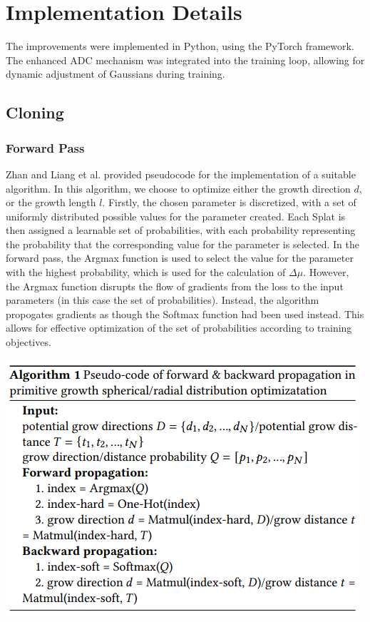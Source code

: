 \documentclass[11pt]{report}
\begin{document}
\section{Implementation Details}
The improvements were implemented in Python, using the PyTorch framework. The enhanced ADC mechanism was integrated into the training loop, allowing for dynamic adjustment of Gaussians during training.

\subsection{Cloning}
\subsubsection{Forward Pass}
Zhan and Liang et al. provided pseudocode for the implementation of a suitable algorithm. In this algorithm, we choose to optimize either the growth direction $d$, or the growth length $l$. Firstly, the chosen parameter is discretized, with a set of uniformly distributed possible values for the parameter created. Each Splat is then assigned a learnable set of probabilities, with each probability representing the probability that the corresponding value for the parameter is selected. In the forward pass, the Argmax function is used to select the value for the parameter with the highest probability, which is used for the calculation of $\Delta \mu$. However, the Argmax function disrupts the flow of gradients from the loss to the input parameters (in this case the set of probabilities). Instead, the algorithm propogates gradients as though the Softmax function had been used instead. This allows for effective optimization of the set of probabilities according to training objectives.
\begin{center}
\begin{minipage}{0.6\linewidth}
\includegraphics[width = \linewidth]{assets/clone_algo}
\end{minipage}
\end{center}
\end{document}
